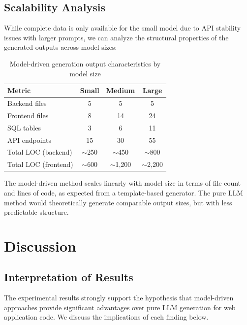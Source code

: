 \documentclass[11pt,a4paper]{article}
\begin{document}
\subsection{Scalability Analysis}

While complete data is only available for the small model due to API stability issues with larger prompts, we can analyze the structural properties of the generated outputs across model sizes:

\begin{table}[H]
\centering
\caption{Model-driven generation output characteristics by model size}
\label{tab:scale}
\begin{tabular}{lccc}
\toprule
\textbf{Metric} & \textbf{Small} & \textbf{Medium} & \textbf{Large} \\
\midrule
Backend files  & 5 & 5 & 5 \\
Frontend files & 8 & 14 & 24 \\
SQL tables     & 3 & 6 & 11 \\
API endpoints  & 15 & 30 & 55 \\
Total LOC (backend)  & $\sim$250 & $\sim$450 & $\sim$800 \\
Total LOC (frontend) & $\sim$600 & $\sim$1,200 & $\sim$2,200 \\
\bottomrule
\end{tabular}
\end{table}

The model-driven method scales linearly with model size in terms of file count and lines of code, as expected from a template-based generator. The pure LLM method would theoretically generate comparable output sizes, but with less predictable structure.

\newpage
\section{Discussion}
\label{sec:discussion}

\subsection{Interpretation of Results}

The experimental results strongly support the hypothesis that model-driven approaches provide significant advantages over pure LLM generation for web application code. We discuss the implications of each finding below.
\end{document}
